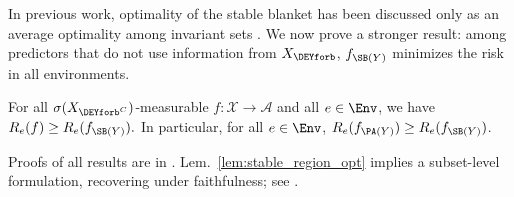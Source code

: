 In previous work, optimality of the stable blanket has been discussed only as an average optimality among invariant sets \citep[Thm.~3.5]{pfisterStabilizingVariableSelection2021}. 
We now prove a stronger result:
among predictors that do not use information from $X_{\DEYforb}$, $f_{\SB(Y)}$ minimizes the risk in all environments.
\begin{lemma} \label{lem:stable_region_opt}
For all $\sigma(X_{\DEYforb^C})$-measurable $f \colon \mathcal{X} \to \mathcal{A}$ and all $e \in \Env$, we have $R_e(f) \geq R_e(f_{\SB(Y)}).$ In particular, for all $e \in \Env$, $R_e(f_{\PA(Y)}) \geq R_e(f_{\SB(Y)})$.
\end{lemma}
Proofs of all results are in . 
Lem.~\ref{lem:stable_region_opt} implies 
a subset-level formulation,
recovering \citep[][Thm.~3.5]{pfisterStabilizingVariableSelection2021} under faithfulness; see .
